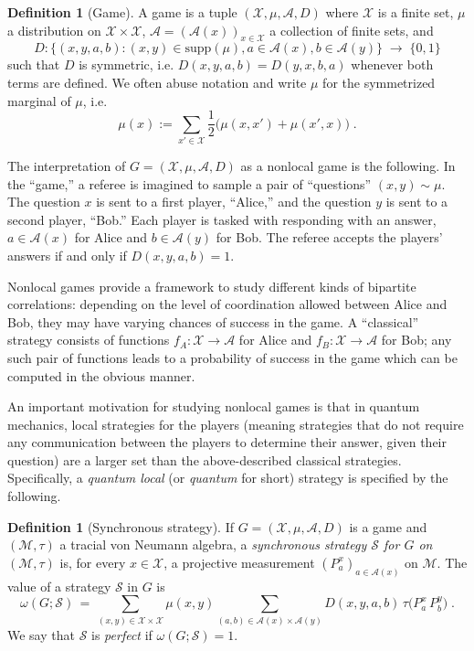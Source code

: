 \documentclass[11pt]{article}
\theoremstyle{definition}
\newtheorem{definition}[theorem]{Definition}
\newcommand{\strategy}{\mathscr{S}}
\DeclareMathOperator*{\Expectation}{\mathbb{E}}
\newcommand{\Es}[1]{\Expectation_{#1}}
\newcommand{\mA}{\ensuremath{\mathcal{A}}}
\newcommand{\mM}{\ensuremath{\mathcal{M}}}
\newcommand{\mX}{\ensuremath{\mathcal{X}}}
\begin{document}
\begin{definition}[Game]
A game is a tuple $(\mX,\mu,\mA,D)$ where $\mX$ is a finite set, $\mu$ a distribution on $\mX\times \mX$, $\mA=(\mA(x))_{x\in\mX}$ a collection of finite sets, and 
\[ D: \big\{ (x,y,a,b) : (x,y)\in\text{supp}(\mu),a\in\mA(x),b\in\mA(y)\big\} \;\to\;\{0,1\}\]
such that $D$ is symmetric, i.e. $D(x,y,a,b)=D(y,x,b,a)$ whenever both terms are defined. We often abuse notation and write $\mu$ for the symmetrized marginal of $\mu$, i.e.\ 
\[\mu(x) := \sum_{x'\in \mX} \frac{1}{2}\big(\mu(x,x')+\mu(x',x)\big)\;.\]
\end{definition}

The interpretation of $G=(\mX,\mu,\mA,D)$ as a nonlocal game is the following. In the ``game,'' a referee is imagined to sample a pair of ``questions'' $(x,y)\sim \mu$. The question $x$ is sent to a first player, ``Alice,'' and the question $y$ is sent to a second player, ``Bob.'' Each player is tasked with responding with an answer, $a\in \mA(x)$ for Alice and $b\in \mA(y)$ for Bob. The referee accepts the players' answers if and only if $D(x,y,a,b)=1$. 

Nonlocal games provide a framework to study different kinds of bipartite correlations: depending on the level of coordination allowed between Alice and Bob, they may have varying chances of success in the game. A ``classical'' strategy consists of functions $f_A:\mX\to\mA$ for Alice and $f_B:\mX\to\mA$ for Bob; any such pair of functions leads to a probability of success in the game which can be computed in the obvious manner. 

An important motivation for studying nonlocal games is that in quantum mechanics, local strategies for the players (meaning strategies that do not require any communication between the players to determine their answer, given their question) are a larger set than the above-described classical strategies. Specifically, a \emph{quantum local} (or \emph{quantum} for short) strategy is specified by the following. 

\begin{definition}[Synchronous strategy]
If $G=(\mX,\mu,\mA,D)$ is a game and $(\mM,\tau)$ a tracial von Neumann algebra, a \emph{synchronous strategy $\strategy$ for $G$ on $(\mM,\tau)$} is, for every $x\in \mX$, a projective measurement $(P^x_a)_{a\in \mA(x)}$ on $\mM$. The value of a strategy $\strategy$ in $G$ is 
\[ \omega(G;\strategy)\,=\, \sum_{(x,y)\in\mX\times\mX}\mu(x,y)\sum_{(a,b)\in\mA(x)\times\mA(y)} D(x,y,a,b)\, \tau\big(P^x_a \,P^y_b\big) \;.%
\]
We say that $\strategy$ is \emph{perfect} if $\omega(G;\strategy)=1$.
\end{definition}
	
\end{document}
